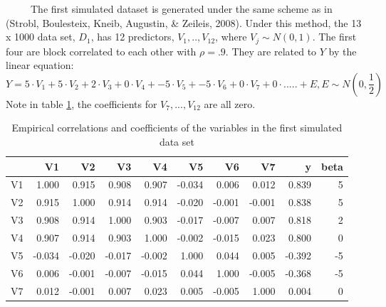 \documentclass[12pt,twoside]{reedthesis}
\begin{document}
  ~~~~~The first simulated dataset is generated under the same scheme as
  in (Strobl, Boulesteix, Kneib, Augustin, \& Zeileis, 2008). Under this
  method, the 13 x 1000 data set, \(D_1\), has 12 predictors,
  \(V_1,..,V_{12}\), where \(V_j \sim N(0,1)\). The first four are block
  correlated to each other with \(\rho = .9\). They are related to \(Y\)
  by the linear equation:
  \[Y = 5 \cdot V_1 + 5 \cdot V_2 + 2 \cdot V_3 + 0 \cdot V_4 + -5 \cdot V_5 + -5\cdot V_6 + 0\cdot V_7 + 0 \cdot ..... + E, E \sim N(0,\frac 1 2 )\]
  Note in table \ref{tab:tabcorSim1}, the coefficients for
  \(V_7,...,V_{12}\) are all zero.
  
  \begin{table}
  
  \caption{\label{tab:unnamed-chunk-12}\label{tab:tabcorSim1}Empirical correlations and coefficients of the variables in the first simulated data set}
  \centering
  \begin{tabular}[t]{l|r|r|r|r|r|r|r|r|r}
  \hline
    & V1 & V2 & V3 & V4 & V5 & V6 & V7 & y & beta\\
  \hline
  V1 & 1.000 & 0.915 & 0.908 & 0.907 & -0.034 & 0.006 & 0.012 & 0.839 & 5\\
  \hline
  V2 & 0.915 & 1.000 & 0.914 & 0.914 & -0.020 & -0.001 & -0.001 & 0.838 & 5\\
  \hline
  V3 & 0.908 & 0.914 & 1.000 & 0.903 & -0.017 & -0.007 & 0.007 & 0.818 & 2\\
  \hline
  V4 & 0.907 & 0.914 & 0.903 & 1.000 & -0.002 & -0.015 & 0.023 & 0.800 & 0\\
  \hline
  V5 & -0.034 & -0.020 & -0.017 & -0.002 & 1.000 & 0.044 & 0.005 & -0.392 & -5\\
  \hline
  V6 & 0.006 & -0.001 & -0.007 & -0.015 & 0.044 & 1.000 & -0.005 & -0.368 & -5\\
  \hline
  V7 & 0.012 & -0.001 & 0.007 & 0.023 & 0.005 & -0.005 & 1.000 & 0.004 & 0\\
  \hline
  \end{tabular}
  \end{table}
  
\end{document}
